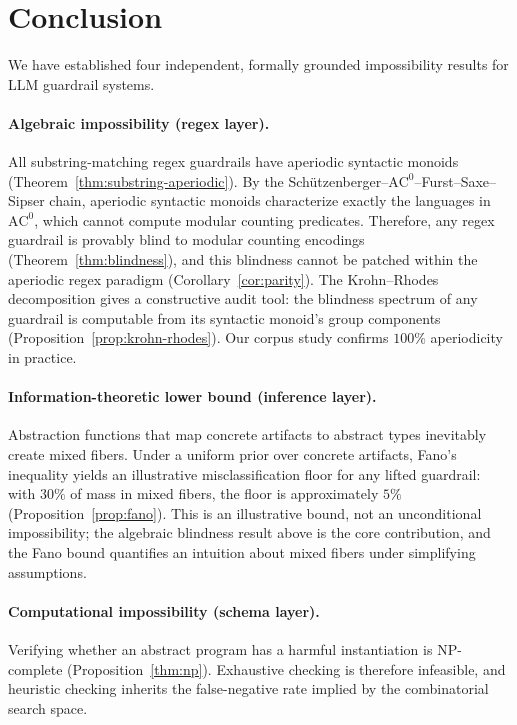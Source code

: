 \documentclass[letterpaper,twocolumn,10pt]{article}
\theoremstyle{definition}
\theoremstyle{remark}
\begin{document}
\section{Conclusion}\label{sec:conclusion}

We have established four independent, formally grounded impossibility results for
LLM guardrail systems.

\paragraph{Algebraic impossibility (regex layer).}
All substring-matching regex guardrails have aperiodic syntactic monoids
(Theorem~\ref{thm:substring-aperiodic}).
By the Sch\"{u}tzenberger--$\mathrm{AC}^0$--Furst--Saxe--Sipser chain, aperiodic
syntactic monoids characterize exactly the languages in $\mathrm{AC}^0$, which
cannot compute modular counting predicates.
Therefore, any regex guardrail is provably blind to modular counting encodings
(Theorem~\ref{thm:blindness}), and this blindness cannot be patched within the
aperiodic regex paradigm (Corollary~\ref{cor:parity}).
The Krohn--Rhodes decomposition gives a constructive audit tool: the blindness
spectrum of any guardrail is computable from its syntactic monoid's group components
(Proposition~\ref{prop:krohn-rhodes}).
Our corpus study confirms $100\%$ aperiodicity in practice.

\paragraph{Information-theoretic lower bound (inference layer).}
Abstraction functions that map concrete artifacts to abstract types
inevitably create mixed fibers.
Under a uniform prior over concrete artifacts, Fano's inequality yields an
illustrative misclassification floor for any lifted guardrail: with
$30\%$ of mass in mixed fibers, the floor is approximately $5\%$
(Proposition~\ref{prop:fano}).
This is an illustrative bound, not an unconditional impossibility; the
algebraic blindness result above is the core contribution, and the Fano
bound quantifies an intuition about mixed fibers under simplifying
assumptions.

\paragraph{Computational impossibility (schema layer).}
Verifying whether an abstract program has a harmful instantiation is NP-complete
(Proposition~\ref{thm:np}).
Exhaustive checking is therefore infeasible, and heuristic checking inherits the
false-negative rate implied by the combinatorial search space.
\end{document}

